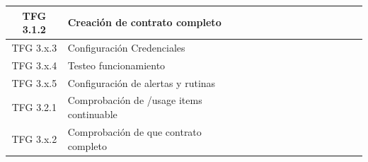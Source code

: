\begin{table}[h!]
\begin{tabular}{|c|l|c|c|c|c|c|c|c|c|c|c|c|c|}
        \hline
        TFG 3.1.2              & Creación de contrato completo                &                       & \cellcolor{ganttblue} & \cellcolor{ganttblue} & \cellcolor{ganttblue} &                       &                       &                       &                       &                       &                       &                       & \hspace{0pt}          \\
        \hline
        TFG 3.x.3              & Configuración Credenciales                   &                       &                       & \cellcolor{ganttblue} & \cellcolor{ganttblue} & \cellcolor{ganttblue} & \cellcolor{ganttblue} & \cellcolor{ganttblue} & \cellcolor{ganttblue} & \cellcolor{ganttblue} & \cellcolor{ganttblue} & \cellcolor{ganttblue} & \cellcolor{ganttblue} \\
        \hline
        TFG 3.x.4              & Testeo funcionamiento                        &                       &                       &                       &                       & \cellcolor{ganttblue} & \cellcolor{ganttblue} & \cellcolor{ganttblue} & \cellcolor{ganttblue} & \cellcolor{ganttblue} & \cellcolor{ganttblue} & \cellcolor{ganttblue} & \cellcolor{ganttblue} \\
        \hline
        TFG 3.x.5              & Configuración de alertas y rutinas           &                       &                       &                       &                       & \cellcolor{ganttblue} & \cellcolor{ganttblue} & \cellcolor{ganttblue} & \cellcolor{ganttblue} & \cellcolor{ganttblue} & \cellcolor{ganttblue} & \cellcolor{ganttblue} & \cellcolor{ganttblue} \\
        \hline
        TFG 3.2.1              & Comprobación de /usage items continuable     &                       &                       &                       &                       &                       & \cellcolor{ganttblue} & \cellcolor{ganttblue} &                       &                       &                       &                       & \hspace{0pt}          \\
        \hline
        TFG 3.x.2              & Comprobación de que contrato completo        &                       &                       &                       &                       &                       & \cellcolor{ganttblue} & \cellcolor{ganttblue} & \cellcolor{ganttblue} & \cellcolor{ganttblue} & \cellcolor{ganttblue} & \cellcolor{ganttblue} & \cellcolor{ganttblue} \\

\end{tabular}
\end{table}
